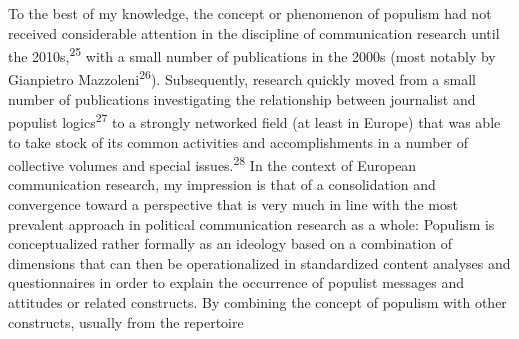 \documentclass{tufte-handout}
\begin{document}
To the best of my knowledge, the concept or phenomenon of populism had
not received considerable attention in the discipline of communication
research until the 2010s,\textsuperscript{25} with a small
number of publications in the 2000s (most notably by Gianpietro
Mazzoleni\textsuperscript{26}). Subsequently,
research quickly moved from a small number of publications investigating
the relationship between journalist and populist logics\textsuperscript{27} to a
strongly networked field (at least in Europe) that was able to take
stock of its common activities and accomplishments in a number of
collective volumes and special issues.\textsuperscript{28} In the context of European communication
research, my impression is that of a consolidation and convergence
toward a perspective that is very much in line with the most prevalent
approach in political communication research as a whole: Populism is
conceptualized rather formally as an ideology based on a combination of
dimensions that can then be operationalized in standardized content
analyses and questionnaires in order to explain the occurrence of
populist messages and attitudes or related constructs. By combining the
concept of populism with other constructs, usually from the repertoire
\end{document}
